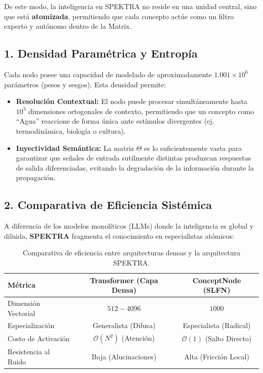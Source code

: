 \documentclass[12pt]{article}
\begin{document}
De este modo, la inteligencia en SPEKTRA no reside en una unidad central, sino que está \textbf{atomizada}, permitiendo que cada concepto actúe como un filtro experto y autónomo dentro de la Matrix.

\subsection{1. Densidad Paramétrica y Entropía}
Cada nodo posee una capacidad de modelado de aproximadamente $1.001 \times 10^6$ parámetros (pesos y sesgos). Esta densidad permite:
\begin{itemize}
	\item \textbf{Resolución Contextual:} El nodo puede procesar simultáneamente hasta $10^3$ dimensiones ortogonales de contexto, permitiendo que un concepto como ``Agua'' reaccione de forma única ante estímulos divergentes (ej. termodinámica, biología o cultura).
	\item \textbf{Inyectividad Semántica:} La matriz $\Theta$ es lo suficientemente vasta para garantizar que señales de entrada sutilmente distintas produzcan respuestas de salida diferenciadas, evitando la degradación de la información durante la propagación.
\end{itemize}

\subsection{2. Comparativa de Eficiencia Sistémica}
A diferencia de los modelos monolíticos (LLMs) donde la inteligencia es global y diluida, \textbf{SPEKTRA} fragmenta el conocimiento en especialistas atómicos:

\begin{table}[h]
	\centering
	\begin{tabular}{|l|c|c|}
		\hline
		\textbf{Métrica} & \textbf{Transformer (Capa Densa)} & \textbf{ConceptNode (SLFN)} \\ \hline
		Dimensión Vectorial & $512 - 4096$ & $1000$ \\ \hline
		Especialización & Generalista (Difusa) & Especialista (Radical) \\ \hline
		Costo de Activación & $\mathcal{O}(N^2)$ (Atención) & $\mathcal{O}(1)$ (Salto Directo) \\ \hline
		Resistencia al Ruido & Baja (Alucinaciones) & Alta (Fricción Local) \\ \hline
	\end{tabular}
	\caption{Comparativa de eficiencia entre arquitecturas densas y la arquitectura SPEKTRA.}
\end{table}
\end{document}
